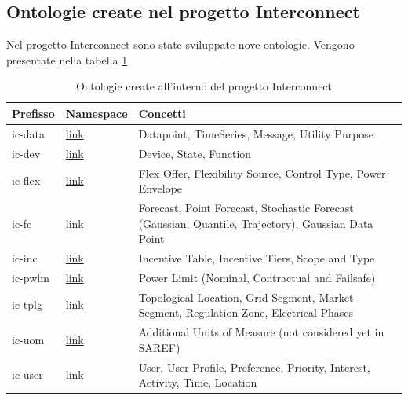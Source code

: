 \subsection{Ontologie create nel progetto Interconnect}
Nel progetto Interconnect sono state sviluppate nove ontologie. Vengono presentate nella tabella \ref{tab:ontologieCreate}
\begin{table}[H]
    \centering
    \begin{tabularx}{\textwidth}{|X|X|X|}
        \hline
        Prefisso & Namespace                                                         & Concetti                                                                                            \\
        \hline
        ic-data  & \href{http://ontology.tno.nl/interconnect/datapoint\#}{link}      & Datapoint, TimeSeries, Message, Utility Purpose                                                     \\
        ic-dev   & \href{http://ontology.tno.nl/interconnect/device\#}{link}         & Device, State, Function                                                                             \\
        ic-flex  & \href{http://ontology.tno.nl/interconnect/flexibility\#}{link}    & Flex Offer, Flexibility Source, Control Type, Power Envelope                                        \\
        ic-fc    & \href{http://ontology.tno.nl/interconnect/forecast\#}{link}       & Forecast, Point Forecast, Stochastic Forecast (Gaussian, Quantile, Trajectory), Gaussian Data Point \\
        ic-inc   & \href{http://ontology.tno.nl/interconnect/incentivetable\#}{link} & Incentive Table, Incentive Tiers, Scope and Type                                                    \\
        ic-pwlm  & \href{http://ontology.tno.nl/interconnect/powerlimit\#}{link}     & Power Limit (Nominal, Contractual and Failsafe)                                                     \\
        ic-tplg  & \href{http://ontology.tno.nl/interconnect/topology\#}{link}       & Topological Location, Grid Segment, Market Segment, Regulation Zone, Electrical Phases              \\
        ic-uom   & \href{http://ontology.tno.nl/interconnect/units\#}{link}          & Additional Units of Measure (not considered yet in SAREF)                                           \\
        ic-user  & \href{http://ontology.tno.nl/interconnect/user\#}{link}           & User, User Profile, Preference, Priority, Interest, Activity, Time, Location                        \\
        \hline
    \end{tabularx}
    \caption{Ontologie create all'interno del progetto Interconnect}
    \label{tab:ontologieCreate}
\end{table}

